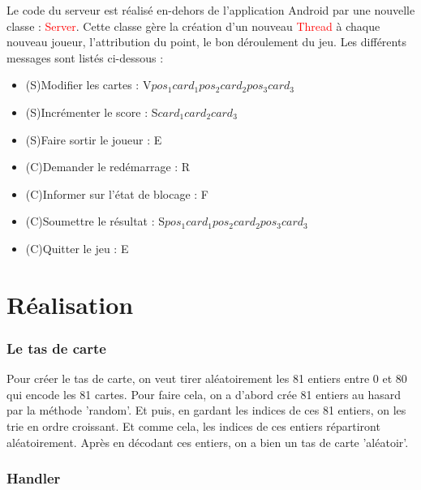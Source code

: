 \documentclass[paper=a4, french]{scrartcl} %
\numberwithin{equation}{section} %
\numberwithin{figure}{section} %
\numberwithin{table}{section} %
\newcommand{\class}[1]{\colorbox{bg}{\textcolor{red}{\usefont{OT1}{cmtt}{m}{n}#1}}}
\begin{document}
Le code du serveur est réalisé en-dehors de l'application Android par une nouvelle classe : \class{Server}. Cette classe gère la création d'un nouveau \class{Thread} à chaque nouveau joueur, l'attribution du point, le bon déroulement du jeu. Les différents messages sont listés ci-dessous : 

\begin{itemize}
\item (S)Modifier les cartes : V{\textvisiblespace}$pos_1${\textvisiblespace}$card_1${\textvisiblespace }$pos_2${\textvisiblespace}$card_2${\textvisiblespace}$pos_3${\textvisiblespace}$card_3$
\item (S)Incrémenter le score : S{\textvisiblespace}$card_1${\textvisiblespace}$card_2${\textvisiblespace}$card_3$
\item (S)Faire sortir le joueur : E
\item (C)Demander le redémarrage : R
\item (C)Informer sur l'état de blocage : F
\item (C)Soumettre le résultat : S{\textvisiblespace}$pos_1${\textvisiblespace}$card_1${\textvisiblespace }$pos_2${\textvisiblespace}$card_2${\textvisiblespace}$pos_3${\textvisiblespace}$card_3$
\item (C)Quitter le jeu : E
\end{itemize}



\section{Réalisation}

	\subsubsection{Le tas de carte}
	Pour créer le tas de carte, on veut tirer aléatoirement les 81 entiers entre 0 et 80 qui encode les 81 cartes. Pour faire cela, on a d'abord crée 81 entiers au hasard par la méthode 'random'. Et puis, en gardant les indices de ces 81 entiers, on les trie en ordre croissant. Et comme cela, les indices de ces entiers répartiront aléatoirement. Après en décodant ces entiers, on a bien un tas de carte 'aléatoir'.
	
	\subsubsection{Handler}
\end{document}
